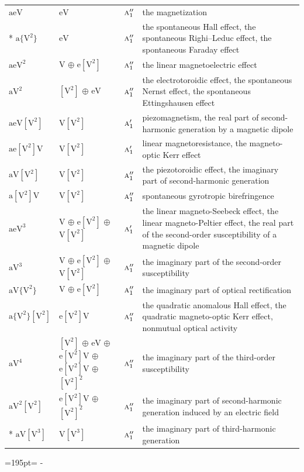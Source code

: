 \documentclass[10pt,a4paper]{article}
\newcommand{\needspace}[1]{\par\penalty-100\begingroup\dimen0=#1\relax\dimen2=\pagegoal
  \advance\dimen2-\pagetotal\ifdim\dimen0>\dimen2\relax\ifdim\dimen2>0pt\vfil\break\fi\fi
  \endgroup}
\numberwithin{equation}{section}
\newcommand{\irr}[1]{\text{\normalfont\scshape #1}}
\newcommand{\jahn}[1]{\mathrm{#1}}
\newlength{\fillwidth}\newlength{\cellwidth}\newlength{\colwidth}
\begin{document}
{\begin{longtable}{@{}lll>{\RaggedRight\arraybackslash}p{\fillwidth}@{}}
\bottomrule\endfoot\endlastfoot
$\jahn{aeV}$ & $\jahn{eV}$ & $\irr{a}_{1}''$ & the magnetization\\*
$\jahn{a\{V^{2}\}}$ & $\jahn{eV}$ & $\irr{a}_{1}''$ & the spontaneous Hall effect, the spontaneous Righi–Leduc effect, the spontaneous Faraday effect\\
$\jahn{aeV^{2}}$ & $\jahn{V}$ $\oplus$ $\jahn{e[V^{2}]}$ & $\irr{a}_{1}''$ & the linear magnetoelectric effect\\
$\jahn{aV^{2}}$ & $\jahn{[V^{2}]}$ $\oplus$ $\jahn{eV}$ & $\irr{a}_{1}''$ & the electrotoroidic effect, the spontaneous Nernst effect, the spontaneous Ettingshausen effect\\
$\jahn{aeV[V^{2}]}$ & $\jahn{V[V^{2}]}$ & $\irr{a}_{1}'$ & piezomagnetism, the real part of second-harmonic generation by a magnetic dipole\\
$\jahn{ae[V^{2}]V}$ & $\jahn{V[V^{2}]}$ & $\irr{a}_{1}'$ & linear magnetoresistance, the magneto-optic Kerr effect\\
$\jahn{aV[V^{2}]}$ & $\jahn{V[V^{2}]}$ & $\irr{a}_{1}''$ & the piezotoroidic effect, the imaginary part of second-harmonic generation\\
$\jahn{a[V^{2}]V}$ & $\jahn{V[V^{2}]}$ & $\irr{a}_{1}''$ & spontaneous gyrotropic birefringence\\
$\jahn{aeV^{3}}$ & $\jahn{V}$ $\oplus$ $\jahn{e[V^{2}]}$ $\oplus$ $\jahn{V[V^{2}]}$ & $\irr{a}_{1}'$ & the linear magneto-Seebeck effect, the linear magneto-Peltier effect, the real part of the second-order susceptibility of a magnetic dipole\\
$\jahn{aV^{3}}$ & $\jahn{V}$ $\oplus$ $\jahn{e[V^{2}]}$ $\oplus$ $\jahn{V[V^{2}]}$ & $\irr{a}_{1}''$ & the imaginary part of the second-order susceptibility\\
$\jahn{aV\{V^{2}\}}$ & $\jahn{V}$ $\oplus$ $\jahn{e[V^{2}]}$ & $\irr{a}_{1}''$ & the imaginary part of optical rectification\\
$\jahn{a\{V^{2}\}[V^{2}]}$ & $\jahn{e[V^{2}]V}$ & $\irr{a}_{1}''$ & the quadratic anomalous Hall effect, the quadratic magneto-optic Kerr effect, nonmutual optical activity\\
$\jahn{aV^{4}}$ & $\jahn{[V^{2}]}$ $\oplus$ $\jahn{eV}$ $\oplus$ $\jahn{e[V^{2}]V}$ $\oplus$ $\jahn{e[V^{2}]V}$ $\oplus$ $\jahn{[V^{2}]^{2}}$ & $\irr{a}_{1}''$ & the imaginary part of the third-order susceptibility\\
$\jahn{aV^{2}[V^{2}]}$ & $\jahn{e[V^{2}]V}$ $\oplus$ $\jahn{[V^{2}]^{2}}$ & $\irr{a}_{1}''$ & the imaginary part of second-harmonic generation induced by an electric field\\*
$\jahn{aV[V^{3}]}$ & $\jahn{V[V^{3}]}$ & $\irr{a}_{1}''$ & the imaginary part of third-harmonic generation\\
\bottomrule\end{longtable}}
\needspace{195pt}
\end{document}
